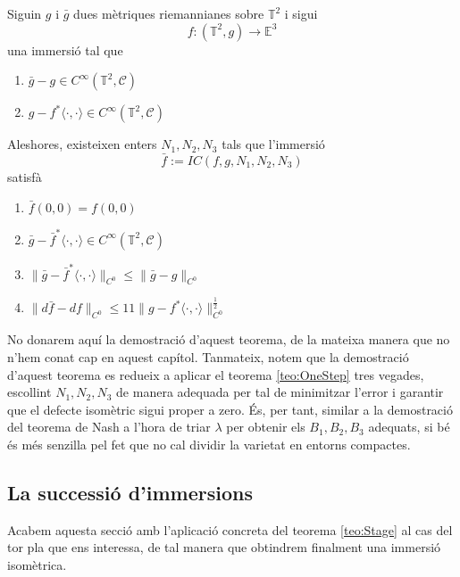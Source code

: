 \begin{teo}\label{teo:Stage}
    Siguin $g$ i $\bar g$ dues mètriques riemannianes sobre $\mathbb T^2$ i sigui 
    \begin{equation*}
        f:(\mathbb T^2, g)\to\mathbb E^3
    \end{equation*}
    una immersió tal que
    \begin{enumerate}
        \item $\bar g - g\in C^\infty(\mathbb T^2, \mathcal C)$
        \item $g-f^*\langle\cdot, \cdot\rangle\in C^\infty(\mathbb T^2, \mathcal C)$
    \end{enumerate}
    Aleshores, existeixen enters $N_1, N_2, N_3$ tals que l'immersió
    \begin{equation*}
        \bar f:=IC(f, g, N_1, N_2, N_3)
    \end{equation*}
    satisfà
    \begin{enumerate}
        \item $\bar f(0,0) = f(0,0)$
        \item $\bar g - \bar f^*\langle\cdot, \cdot\rangle\in C^\infty(\mathbb T^2, \mathcal C)$
        \item $\|\bar g - \bar f^*\langle\cdot, \cdot\rangle\|_{C^0}\le \|\bar g - g\|_{C^0}$
        \item $\|d\bar f - df\|_{C^0}\le11\|g-f^*\langle\cdot, \cdot\rangle\|_{C^0}^{\frac{1}{2}}$
    \end{enumerate}
\end{teo}

\begin{obs}
    No donarem aquí la demostració d'aquest teorema, de la mateixa manera que no n'hem conat cap en aquest capítol. Tanmateix, notem que la demostració d'aquest teorema es redueix a aplicar el teorema \ref{teo:OneStep} tres vegades, escollint $N_1, N_2, N_3$ de manera adequada per tal de minimitzar l'error i garantir que el defecte isomètric sigui proper a zero. És, per tant, similar a la demostració del teorema de Nash a l'hora de triar $\lambda$ per obtenir els $B_1, B_2, B_3$ adequats, si bé és més senzilla pel fet que no cal dividir la varietat en entorns compactes.
\end{obs}

\subsection{La successió d'immersions}
Acabem aquesta secció amb l'aplicació concreta del teorema \ref{teo:Stage} al cas del tor pla que ens interessa, de tal manera que obtindrem finalment una immersió isomètrica.

